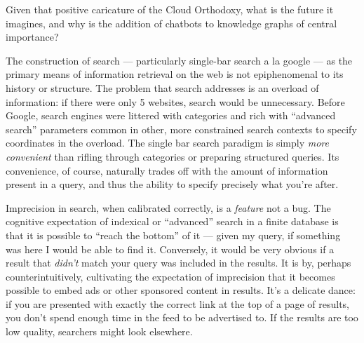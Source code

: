 Given that positive caricature of the Cloud Orthodoxy, what is the
future it imagines, and why is the addition of chatbots to knowledge
graphs of central importance?

The construction of search --- particularly single-bar search a la
google --- as the primary means of information retrieval on the web is
not epiphenomenal to its history or structure. The problem that search
addresses is an overload of information: if there were only 5 websites,
search would be unnecessary. Before Google, search engines were littered
with categories and rich with ``advanced search'' parameters common in
other, more constrained search contexts to specify coordinates in the
overload. The single bar search paradigm is simply \emph{more
convenient} than rifling through categories or preparing structured
queries. Its convenience, of course, naturally trades off with the
amount of information present in a query, and thus the ability to
specify precisely what you're after.

Imprecision in search, when calibrated correctly, is a \emph{feature}
not a bug. The cognitive expectation of indexical or ``advanced''
search in a finite database is that it is possible to ``reach the
bottom'' of it --- given my query, if something was here I would be able
to find it. Conversely, it would be very obvious if a result that
\emph{didn't} match your query was included in the results. It is by,
perhaps counterintuitively, cultivating the expectation of imprecision
that it becomes possible to embed ads or other sponsored content in
results. It's a delicate
dance: if you are presented with exactly the correct link at the top of
a page of results, you don't spend enough time in the feed to be
advertised to. If the results are too low quality, searchers might look
elsewhere.

